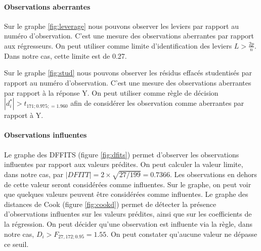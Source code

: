 \documentclass[11pt,a4paper]{article}
\begin{document}
\paragraph{Observations aberrantes}
Sur le graphe \ref{fig:leverage} nous pouvons observer les leviers par rapport au numéro d'observation. C'est une mesure des observations aberrantes par rapport aux régresseurs. On peut utiliser comme limite d'identification des leviers $L>\frac{2p}{n}$. Dans notre cas, cette limite est de 0.27.


Sur le graphe \ref{fig:stud} nous pouvons observer les résidus effacés studentisés par rapport au numéro d'observation. C'est une mesure des observations aberrantes par rapport  à la réponse Y.
On peut utiliser comme règle de décision $|d_{i}^{*}| > t_{171;0.975; = 1.960}$ afin de considérer les observation comme aberrantes par rapport à Y.

\paragraph{Observations influentes} Le graphe des DFFITS (figure \ref{fig:dfits}) permet d'observer les observations influentes par rapport aux valeurs prédites. On peut calculer la valeur limite, dans notre cas, par $|DFITT|= 2 \times \sqrt{27/199} = 0.7366$. Les observations en dehors de cette valeur seront considérées comme influentes. Sur le graphe, on peut voir que quelques valeurs peuvent être considérées comme influentes. Le graphe des distances de Cook (figure \ref{fig:cookd}) permet de détecter la présence d'observations influentes sur les valeurs prédites, ainsi que sur les coefficients de la régression. On peut décider qu'une observation est influente via la règle, dans notre cas, $D_{i} > F_{27,172;0.95} = 1.55$. On peut constater qu'aucune valeur ne dépasse ce seuil.
\end{document}
